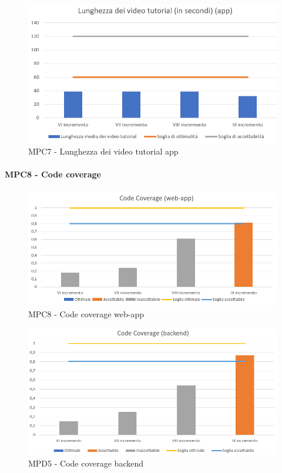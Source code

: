   \begin{figure}[h!]
    \centering
      \includegraphics[scale=1]{Immagini/lunghVideoTut APPA.PNG}
    \caption{MPC7 - Lunghezza dei video tutorial app}
  \end{figure}



  \clearpage
  \paragraph{MPC8 - Code coverage}
  \begin{figure}[h!]
    \centering
      \includegraphics[scale=1]{Immagini/CodeCov WAA.PNG}
    \caption{MPC8 - Code coverage web-app}
  \end{figure}

  \begin{figure}[h!]
    \centering
      \includegraphics[scale=1]{Immagini/CodeCov BEA.PNG}
    \caption{MPD5 - Code coverage backend}
  \end{figure}

